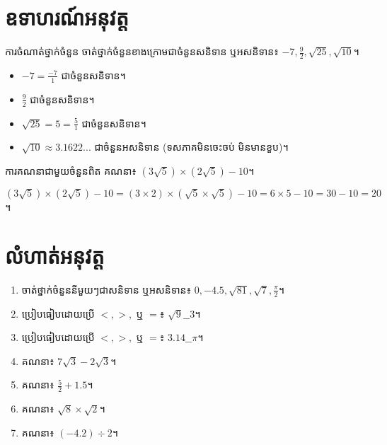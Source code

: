 \section{ឧទាហរណ៍អនុវត្ត}
\begin{example}{ការចំណាត់ថ្នាក់ចំនួន}
    ចាត់ថ្នាក់ចំនួនខាងក្រោមជាចំនួនសនិទាន ឬអសនិទាន៖ $-7, \frac{9}{2}, \sqrt{25}, \sqrt{10}$។
    \begin{solution}
        \begin{itemize}
            \item $-7 = \frac{-7}{1}$ ជាចំនួនសនិទាន។
            \item $\frac{9}{2}$ ជាចំនួនសនិទាន។
            \item $\sqrt{25} = 5 = \frac{5}{1}$ ជាចំនួនសនិទាន។
            \item $\sqrt{10} \approx 3.1622...$ ជាចំនួនអសនិទាន (ទសភាគមិនចេះចប់ មិនមានខួប)។
        \end{itemize}
    \end{solution}
\end{example}

\begin{example}{ការគណនាជាមួយចំនួនពិត}
    គណនា៖ $(3\sqrt{5}) \times (2\sqrt{5}) - 10$។
    \begin{solution}
        $(3\sqrt{5}) \times (2\sqrt{5}) - 10 = (3 \times 2) \times (\sqrt{5} \times \sqrt{5}) - 10 = 6 \times 5 - 10 = 30 - 10 = 20$។
    \end{solution}
\end{example}

\section{លំហាត់អនុវត្ត}
\begin{enumerate}[label=\arabic*.]
    \item ចាត់ថ្នាក់ចំនួននីមួយៗជាសនិទាន ឬអសនិទាន៖ $0, -4.5, \sqrt{81}, \sqrt{7}, \frac{\pi}{2}$។
    \item ប្រៀបធៀបដោយប្រើ $<, >,$ ឬ $=$៖ $\sqrt{9} \_\_ 3$។
    \item ប្រៀបធៀបដោយប្រើ $<, >,$ ឬ $=$៖ $3.14 \_\_ \pi$។
    \item គណនា៖ $7\sqrt{3} - 2\sqrt{3}$។
    \item គណនា៖ $\frac{5}{2} + 1.5$។
    \item គណនា៖ $\sqrt{8} \times \sqrt{2}$។
    \item គណនា៖ $(-4.2) \div 2$។
\end{enumerate}

